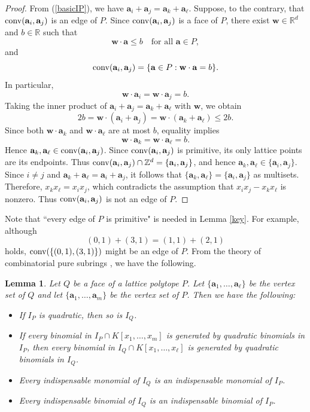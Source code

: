 \documentclass[12pt]{amsart}
\newtheorem{lemma}[thm]{Lemma}
\theoremstyle{definition}
\numberwithin{thm}{section}
\numberwithin{equation}{section}
\def\NZQ{\mathbb}               %
\def\ZZ{{\NZQ Z}}
\def\RR{{\NZQ R}}
\def\ab{{\mathbf a}}
\def\wb{{\mathbf w}}
\begin{document}
\begin{proof}
From (\ref{basicIP}), we have $\ab_i+\ab_j=\ab_k+\ab_\ell$.
Suppose, to the contrary, that 
${\rm conv}(\ab_i,\ab_j)$ is an edge of $P$. 
Since ${\rm conv}(\ab_i,\ab_j)$ is a face of $P$, there exist $\wb\in\RR^d$ and $b\in\RR$ such that \[ \wb\cdot\ab\leq b \quad\text{for all $\ab\in P$}, \] and \[ {\rm conv}(\ab_i,\ab_j)=\{\ab\in P:\wb\cdot\ab=b\}. \] 
In particular, \[ \wb\cdot\ab_i=\wb\cdot\ab_j=b. \] 
Taking the inner product of $\ab_i+\ab_j=\ab_k+\ab_\ell$ with $\wb$, we obtain \[ 2b = \wb\cdot(\ab_i+\ab_j) = \wb\cdot(\ab_k+\ab_\ell) \leq 2b. \] 
Since both $\wb\cdot\ab_k$ and $\wb\cdot\ab_\ell$ are at most $b$, equality implies \[ \wb\cdot\ab_k=\wb\cdot\ab_\ell=b. \] Hence $\ab_k,\ab_\ell\in {\rm conv}(\ab_i,\ab_j)$. 
Since ${\rm conv}(\ab_i,\ab_j)$ is primitive, its only lattice points are its endpoints. 
Thus ${\rm conv}(\ab_i,\ab_j)\cap\ZZ^d=\{\ab_i,\ab_j\}$, and hence $\ab_k,\ab_\ell\in\{\ab_i,\ab_j\}$. 
Since $i\neq j$ and $\ab_k+\ab_\ell=\ab_i+\ab_j$, it follows that $\{\ab_k,\ab_\ell\}=\{\ab_i,\ab_j\}$ as multisets. 
Therefore, $x_kx_\ell=x_ix_j$, which contradicts the assumption that $x_ix_j-x_kx_\ell$ is nonzero. 
Thus ${\rm conv}(\ab_i,\ab_j)$ is not an edge of $P$. 
\end{proof}

Note that ``every edge of $P$ is primitive" is needed in Lemma \ref{key}.
For example, although
\[
(0,1) + (3,1) = (1,1) + (2,1) 
\]
holds,
${\rm conv}(\{ (0,1), (3,1) \})$ might be an edge of $P$.
From the theory of combinatorial pure subrings \cite{cpureR1, cpure}, we have the following.

\begin{lemma}\label{cp}
    Let $Q$ be a face of a lattice polytope $P$.
    Let $\{\ab_1,\dots,\ab_\ell\}$ be the vertex set of $Q$
    and let $\{\ab_1,\dots,\ab_m\}$ be the vertex set of $P$.    
    Then we have the following{\rm :}
    \begin{itemize}
        \item[(i)]    If $I_P$ is quadratic,
    then so is $I_Q$.
    \item[(ii)] 
    If every binomial in \(I_P \cap K[x_1,\dots,x_m]\) is generated by quadratic binomials in \(I_P\), then every binomial in 
\(I_Q \cap K[x_1,\dots,x_\ell]\) is generated by quadratic binomials in \(I_Q\).  
\item[(iii)] Every indispensable monomial of $I_Q$ is an indispensable monomial of $I_P$. 
\item[(iv)] Every indispensable binomial of $I_Q$ is an indispensable binomial of $I_P$.
    \end{itemize}
 
\end{lemma}
\end{document}
